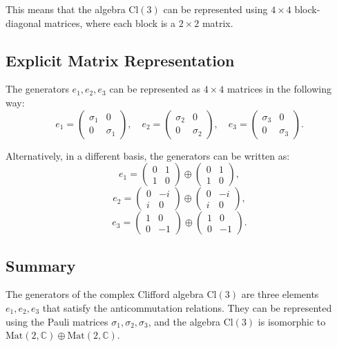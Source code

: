 \documentclass{article}
\begin{document}
This means that the algebra \( \text{Cl}(3) \) can be represented using \( 4 \times 4 \) block-diagonal matrices, where each block is a \( 2 \times 2 \) matrix.

\subsection*{Explicit Matrix Representation}
The generators \( e_1, e_2, e_3 \) can be represented as \( 4 \times 4 \) matrices in the following way:
\[
e_1 = \begin{pmatrix} \sigma_1 & 0 \\ 0 & \sigma_1 \end{pmatrix}, \quad
e_2 = \begin{pmatrix} \sigma_2 & 0 \\ 0 & \sigma_2 \end{pmatrix}, \quad
e_3 = \begin{pmatrix} \sigma_3 & 0 \\ 0 & \sigma_3 \end{pmatrix}.
\]

Alternatively, in a different basis, the generators can be written as:
\[
e_1 = \begin{pmatrix} 0 & 1 \\ 1 & 0 \end{pmatrix} \oplus \begin{pmatrix} 0 & 1 \\ 1 & 0 \end{pmatrix},
\]
\[
e_2 = \begin{pmatrix} 0 & -i \\ i & 0 \end{pmatrix} \oplus \begin{pmatrix} 0 & -i \\ i & 0 \end{pmatrix},
\]
\[
e_3 = \begin{pmatrix} 1 & 0 \\ 0 & -1 \end{pmatrix} \oplus \begin{pmatrix} 1 & 0 \\ 0 & -1 \end{pmatrix}.
\]

\subsection*{Summary}
The generators of the complex Clifford algebra \( \text{Cl}(3) \) are three elements \( e_1, e_2, e_3 \) that satisfy the anticommutation relations. They can be represented using the Pauli matrices \( \sigma_1, \sigma_2, \sigma_3 \), and the algebra \( \text{Cl}(3) \) is isomorphic to \( \text{Mat}(2, \mathbb{C}) \oplus \text{Mat}(2, \mathbb{C}) \).
\end{document}
